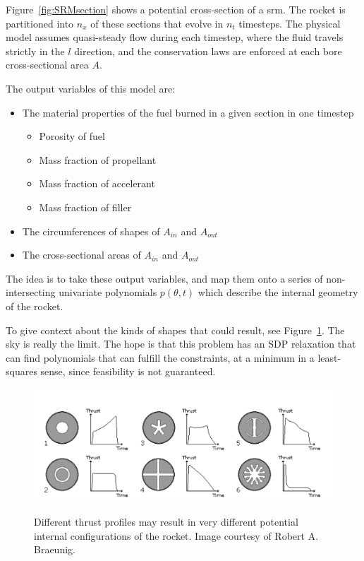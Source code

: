 \documentclass[11pt]{article}
\begin{document}
Figure~\ref{fig:SRMsection} shows a potential cross-section of a \gls{srm}.
The rocket is partitioned into $n_x$ of these sections that evolve in $n_t$ timesteps. The physical model assumes quasi-steady flow during each timestep, where the fluid travels strictly
in the $l$ direction, and the conservation laws are enforced at
each bore cross-sectional area $A$.

The output variables of this model are:
    
    \begin{itemize}
    \item The material properties of the fuel burned in a given section in one timestep
        \begin{itemize}
        \item Porosity of fuel
        \item Mass fraction of propellant
        \item Mass fraction of accelerant
        \item Mass fraction of filler
        \end{itemize}
    \item The circumferences of shapes of $A_{in}$ and $A_{out}$
    \item The cross-sectional areas of $A_{in}$ and $A_{out}$
    \end{itemize}
    
The idea is to take these output variables, and map them onto a series of 
non-intersecting univariate polynomials $p(\theta, t)$ which describe the internal geometry of the rocket. 

To give context about the kinds of shapes that could result, see Figure~\ref{fig:potentialShapes}. The sky is really the limit. The hope is that this problem has an SDP relaxation that can find polynomials that can fulfill the constraints, at a minimum in a least-squares sense, since feasibility is not guaranteed. 

\begin{figure}
\centering
\includegraphics[width=0.7\linewidth]{figures/potentialShapes.png}
\label{fig:potentialShapes}
\caption{Different thrust profiles may result in very different potential internal configurations of the rocket. Image courtesy of Robert A. Braeunig.}

\end{figure}
\end{document}

